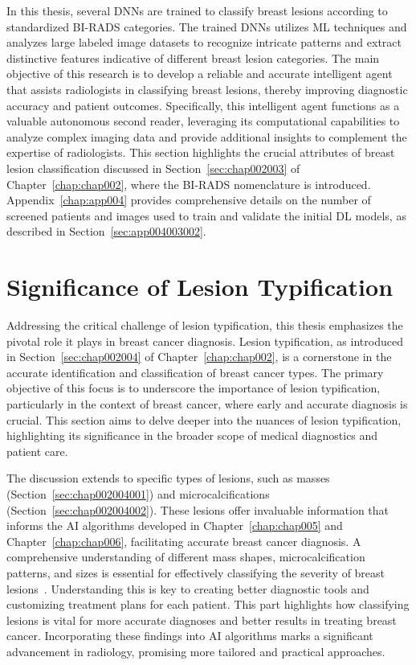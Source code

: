 In this thesis, several \acp{DNN} are trained to classify breast lesions according to standardized \ac{BI-RADS} categories.
The trained \acp{DNN} utilizes \ac{ML} techniques and analyzes large labeled image datasets to recognize intricate patterns and extract distinctive features indicative of different breast lesion categories.
The main objective of this research is to develop a reliable and accurate intelligent agent that assists radiologists in classifying breast lesions, thereby improving diagnostic accuracy and patient outcomes.
Specifically, this intelligent agent functions as a valuable autonomous second reader, leveraging its computational capabilities to analyze complex imaging data and provide additional insights to complement the expertise of radiologists.
This section highlights the crucial attributes of breast lesion classification discussed in Section~\ref{sec:chap002003} of Chapter~\ref{chap:chap002}, where the \ac{BI-RADS} nomenclature is introduced.
Appendix~\ref{chap:app004} provides comprehensive details on the number of screened patients and images used to train and validate the initial \ac{DL} models, as described in Section~\ref{sec:app004003002}.

\section{Significance of Lesion Typification}
\label{sec:app001004}

Addressing the critical challenge of lesion typification, this thesis emphasizes the pivotal role it plays in breast cancer diagnosis.
Lesion typification, as introduced in Section~\ref{sec:chap002004} of Chapter~\ref{chap:chap002}, is a cornerstone in the accurate identification and classification of breast cancer types.
The primary objective of this focus is to underscore the importance of lesion typification, particularly in the context of breast cancer, where early and accurate diagnosis is crucial.
This section aims to delve deeper into the nuances of lesion typification, highlighting its significance in the broader scope of medical diagnostics and patient care.

The discussion extends to specific types of lesions, such as masses (Section~\ref{sec:chap002004001}) and microcalcifications (Section~\ref{sec:chap002004002}).
These lesions offer invaluable information that informs the \ac{AI} algorithms developed in Chapter~\ref{chap:chap005} and Chapter~\ref{chap:chap006}, facilitating accurate breast cancer diagnosis.
A comprehensive understanding of different mass shapes, microcalcification patterns, and sizes is essential for effectively classifying the severity of breast lesions~\cite{8611096, 9231684}.
Understanding this is key to creating better diagnostic tools and customizing treatment plans for each patient.
This part highlights how classifying lesions is vital for more accurate diagnoses and better results in treating breast cancer.
Incorporating these findings into \ac{AI} algorithms marks a significant advancement in radiology, promising more tailored and practical approaches.

